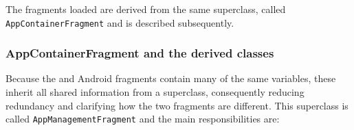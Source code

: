 The fragments loaded are derived from the same superclass, called \lstinline|AppContainerFragment| and is described subsequently.
%



 

\subsubsection{AppContainerFragment and the derived classes}

Because the \giraf and Android fragments contain many of the same variables, these inherit all shared information from a superclass, consequently reducing redundancy and clarifying how the two fragments are different.
This superclass is called \lstinline!AppManagementFragment! and the main responsibilities are:

